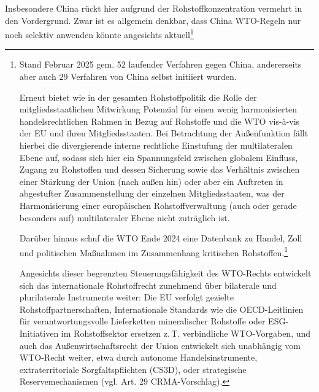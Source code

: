 \documentclass[12pt,a4paper,oneside]{book} %
\begin{document}
Insbesondere China rückt hier aufgrund der Rohstoffkonzentration vermehrt in den Vordergrund. Zwar ist es allgemein denkbar, dass China WTO-Regeln nur noch selektiv anwenden könnte angesichts aktuell\footnote{Stand Februar 2025 gem. %
52 laufender Verfahren gegen China, andererseits aber auch 29 Verfahren von China selbst initiiert wurden.

Erneut bietet wie in der gesamten Rohstoffpolitik die Rolle der mitgliedsstaatlichen Mitwirkung Potenzial für einen wenig harmonisierten handelsrechtlichen Rahmen in Bezug auf Rohstoffe und die WTO vis-à-vis der EU und ihren Mitgliedsstaaten. Bei Betrachtung der Außenfunktion fällt hierbei die divergierende interne rechtliche Einstufung der multilateralen Ebene auf, sodass sich hier ein Spannungsfeld zwischen globalem Einfluss, Zugang zu Rohstoffen und dessen Sicherung sowie das Verhältnis zwischen einer Stärkung der Union (nach außen hin) oder aber ein Auftreten in abgestufter Zusammenstellung der einzelnen Mitgliedsstaaten,\autocite{Dauses/Ludwigs, Handbuch des EU-Wirtschaftsrechts, A. I., Rn. 43} was der Harmonisierung einer europäischen Rohstoffverwaltung (auch oder gerade besonders auf) multilateraler Ebene nicht zuträglich ist.

Darüber hinaus schuf die WTO Ende 2024 eine Datenbank zu Handel, Zoll und politischen Maßnahmen im Zusammenhang kritischen Rohstoffen.\footnote{abrufbar unter www.critmin.org.}

Angesichts dieser begrenzten Steuerungsfähigkeit des WTO-Rechts entwickelt sich das internationale Rohstoffrecht zunehmend über bilaterale und plurilaterale Instrumente weiter: Die EU verfolgt gezielte Rohstoffpartnerschaften, Internationale Standards wie die OECD-Leitlinien für verantwortungsvolle Lieferketten mineralischer Rohstoffe oder ESG-Initiativen im Rohstoffsektor ersetzen z. T. verbindliche WTO-Vorgaben, und auch das Außenwirtschaftsrecht der Union entwickelt sich unabhängig vom WTO-Recht weiter, etwa durch autonome Handelsinstrumente, extraterritoriale Sorgfaltspflichten (CS3D), oder strategische Reservemechanismen (vgl. Art. 29 CRMA-Vorschlag).

}
\end{document}
